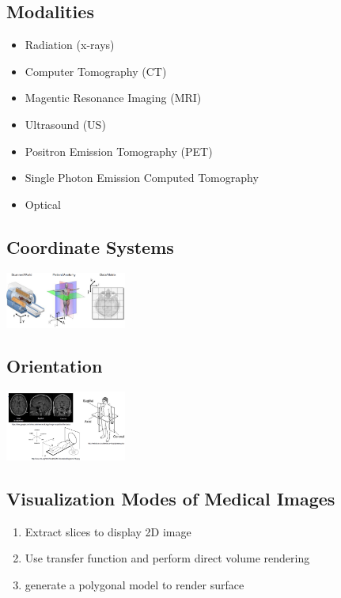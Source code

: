 \documentclass{report}
\newenvironment{Figure}
	{\par\medskip\noindent\minipage{\linewidth}}
	{\endminipage\par\medskip}
\theoremstyle{definition}
\theoremstyle{example}
\begin{document}
\subsection{Modalities}
\begin{itemize}
   \item Radiation (x-rays)
   \item Computer Tomography (CT)
   \item Magentic Resonance Imaging (MRI)
   \item Ultrasound (US)
   \item Positron Emission Tomography (PET)
   \item Single Photon Emission Computed Tomography
   \item Optical
\end{itemize}

\subsection{Coordinate Systems}
\begin{Figure}
   \centering
    \includegraphics[width=150px]{img/CoordinateSystems.png}
        \label{fig:Coordinate Systems}
\end{Figure}

\subsection{Orientation}
\begin{Figure}
   \centering
    \includegraphics[width=150px]{img/Orientation.png}
        \label{fig:Orientation}
\end{Figure}

\subsection{Visualization Modes of Medical Images}
\begin{enumerate}
   \item Extract slices to display 2D image
   \item Use transfer function and perform direct volume rendering
   \item generate a polygonal model to render surface
\end{enumerate}
\end{document}
